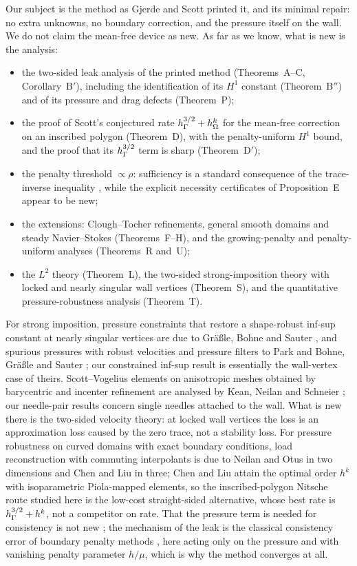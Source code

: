Our subject is the method as Gjerde and Scott printed it, and its minimal repair: no extra unknowns, no boundary correction, and the pressure itself on the wall. We do not claim the mean-free device as new. As far as we know, what is new is the analysis:
\begin{itemize}
\item the two-sided leak analysis of the printed method (Theorems~A--C, Corollary~B$'$), including the identification of its $H^1$ constant (Theorem~B$''$) and of its pressure and drag defects (Theorem~P);
\item the proof of Scott's conjectured rate $h_\Gamma^{3/2}+h_\Omega^k$ for the mean-free correction on an inscribed polygon (Theorem~D), with the penalty-uniform $H^1$ bound, and the proof that its $h_\Gamma^{3/2}$ term is sharp (Theorem~D$'$);
\item the penalty threshold $\propto\rho$: sufficiency is a standard consequence of the trace-inverse inequality \cite{Stenberg1995,JuntunenStenberg2009}, while the explicit necessity certificates of Proposition~E appear to be new;
\item the extensions: Clough--Tocher refinements, general smooth domains and steady Navier--Stokes (Theorems~F--H), and the growing-penalty and penalty-uniform analyses (Theorems~R and~U);
\item the $L^2$ theory (Theorem~L), the two-sided strong-imposition theory with locked and nearly singular wall vertices (Theorem~S), and the quantitative pressure-robustness analysis (Theorem~T).
\end{itemize}
For strong imposition, pressure constraints that restore a shape-robust inf-sup constant at nearly singular vertices are due to Gr\"a\ss le, Bohne and Sauter \cite{GrassleBohneSauter2024}, and spurious pressures with robust velocities and pressure filters to Park \cite{Park2020} and Bohne, Gr\"a\ss le and Sauter \cite{BohneGrassleSauter2025}; our constrained inf-sup result is essentially the wall-vertex case of theirs. Scott--Vogelius elements on anisotropic meshes obtained by barycentric and incenter refinement are analysed by Kean, Neilan and Schneier \cite{KeanNeilanSchneier2022}; our needle-pair results concern single needles attached to the wall. What is new there is the two-sided velocity theory: at locked wall vertices the loss is an approximation loss caused by the zero trace, not a stability loss. For pressure robustness on curved domains with exact boundary conditions, load reconstruction with commuting interpolants is due to Neilan and Otus \cite[Theorem~6.1]{NeilanOtus2021} in two dimensions and Chen and Liu \cite{ChenLiu2026} in three; Chen and Liu attain the optimal order $h^k$ with isoparametric Piola-mapped elements, so the inscribed-polygon Nitsche route studied here is the low-cost straight-sided alternative, whose best rate is $h_\Gamma^{3/2}+h^k$, not a competitor on rate.
That the pressure term is needed for consistency is not new \cite{BurmanHansboLarson2019Stokes}; the mechanism of the leak is the classical consistency error of boundary penalty methods \cite{Babuska1973}, here acting only on the pressure and with vanishing penalty parameter $h/\mu$, which is why the method converges at all.

